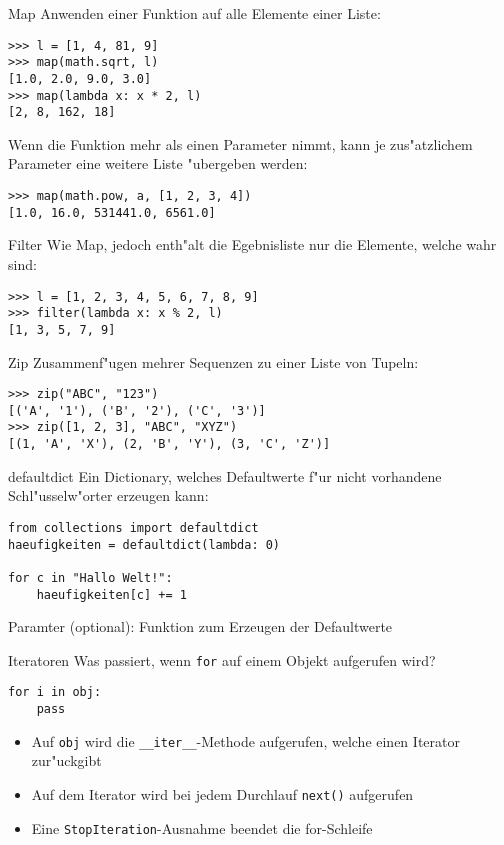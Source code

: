 \begin{frame}[fragile]{Map}
Anwenden einer Funktion auf alle Elemente einer Liste:
\begin{lstlisting}[style=Shell]
>>> l = [1, 4, 81, 9]
>>> map(math.sqrt, l)
[1.0, 2.0, 9.0, 3.0]
>>> map(lambda x: x * 2, l)
[2, 8, 162, 18]
\end{lstlisting}
Wenn die Funktion mehr als einen Parameter nimmt, kann je zus"atzlichem Parameter eine weitere Liste "ubergeben werden:
\begin{lstlisting}[style=Shell]
>>> map(math.pow, a, [1, 2, 3, 4])
[1.0, 16.0, 531441.0, 6561.0]
\end{lstlisting}
\end{frame} 

\begin{frame}[fragile]{Filter}
Wie Map, jedoch enth"alt die Egebnisliste nur die Elemente, welche wahr sind:
\begin{lstlisting}[style=Shell]
>>> l = [1, 2, 3, 4, 5, 6, 7, 8, 9]
>>> filter(lambda x: x % 2, l)
[1, 3, 5, 7, 9]
\end{lstlisting}
\end{frame} 

\begin{frame}[fragile]{Zip}
Zusammenf"ugen mehrer Sequenzen zu einer Liste von Tupeln:
\begin{lstlisting}[style=Shell]
>>> zip("ABC", "123")
[('A', '1'), ('B', '2'), ('C', '3')]
>>> zip([1, 2, 3], "ABC", "XYZ")
[(1, 'A', 'X'), (2, 'B', 'Y'), (3, 'C', 'Z')]
\end{lstlisting}
\end{frame}


\begin{frame}[fragile]{defaultdict}
Ein Dictionary, welches Defaultwerte f"ur nicht vorhandene Schl"usselw"orter erzeugen kann:
\begin{lstlisting}
from collections import defaultdict
haeufigkeiten = defaultdict(lambda: 0)

for c in "Hallo Welt!":
    haeufigkeiten[c] += 1
\end{lstlisting}
Paramter (optional): Funktion zum Erzeugen der Defaultwerte
\end{frame}

\begin{frame}[fragile]{Iteratoren}
Was passiert, wenn \lstinline{for} auf einem Objekt aufgerufen wird?
\begin{lstlisting}[style=Python]
for i in obj:
    pass
\end{lstlisting}
\begin{itemize}
\item Auf \lstinline{obj} wird die \lstinline{__iter__}-Methode aufgerufen, welche einen \alert{Iterator} zur"uckgibt
\item Auf dem Iterator wird bei jedem Durchlauf \alert{\lstinline{next()}} aufgerufen
\item Eine \lstinline{StopIteration}-Ausnahme beendet die for-Schleife
\end{itemize}
\end{frame}

